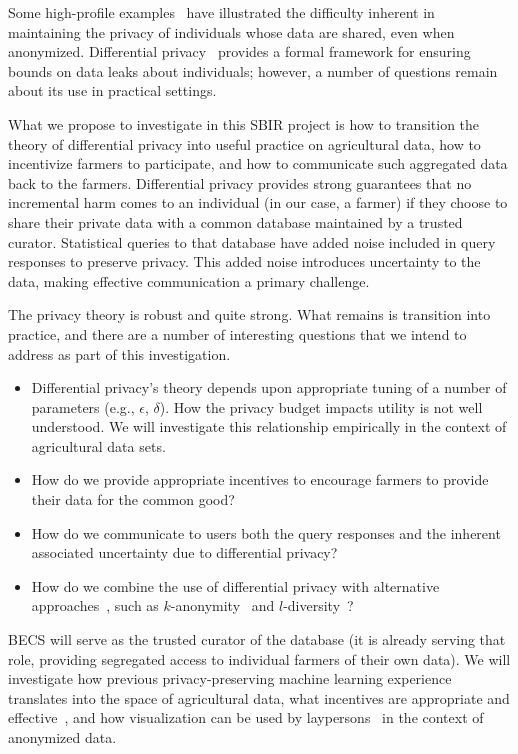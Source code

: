 Some high-profile examples~\cite{bz06,bk07} have illustrated the
difficulty inherent in maintaining the privacy of individuals whose
data are shared, even when anonymized.
Differential privacy~\cite{dwork11,dr14} provides a formal framework
for ensuring bounds on data leaks about individuals; however,
a number of questions remain about its use in practical settings.

What we propose to investigate in this SBIR project is how to transition
the theory of differential privacy into useful practice on agricultural data,
how to incentivize farmers to participate,
and how to communicate such aggregated data back to the farmers.  
Differential privacy provides strong guarantees that no incremental harm
comes to an individual (in our case, a farmer) if they choose to share
their private data with a common database maintained by a trusted curator.
Statistical queries to that database have added noise included in
query responses to preserve privacy.
This added noise introduces uncertainty to the data,
making effective communication a primary challenge. 

The privacy theory is robust and quite strong.  What remains is transition into
practice, and there are a number of interesting questions that we intend
to address as part of this investigation.
\begin{itemize}
\item Differential privacy's theory depends upon appropriate tuning of a number
of parameters (e.g., $\epsilon$, $\delta$).  How the privacy budget impacts
utility is not well understood.  We will investigate this relationship
empirically in the context of agricultural data sets.
\item How do we provide appropriate incentives to encourage farmers to
provide their data for the common good?
\item How do we communicate to users both the query responses and the
inherent associated uncertainty due to differential privacy?
\item How do we combine the use of differential privacy with alternative
approaches~\cite{ct13}, such as $k$-anonymity~\cite{samarati01,sweeney02} and
$l$-diversity~\cite{mkgv07}?
\end{itemize}
BECS will serve as the trusted curator of the database (it is already serving
that role, providing segregated access to individual farmers of their own data).
We will investigate how previous privacy-preserving machine learning
experience~\cite{acgmmtz16,ss15} translates into the space of agricultural data,
what incentives are appropriate and effective~\cite{hssv15},
and how visualization can be used by
laypersons~\cite{ottley2012visually} in the context of anonymized data.

